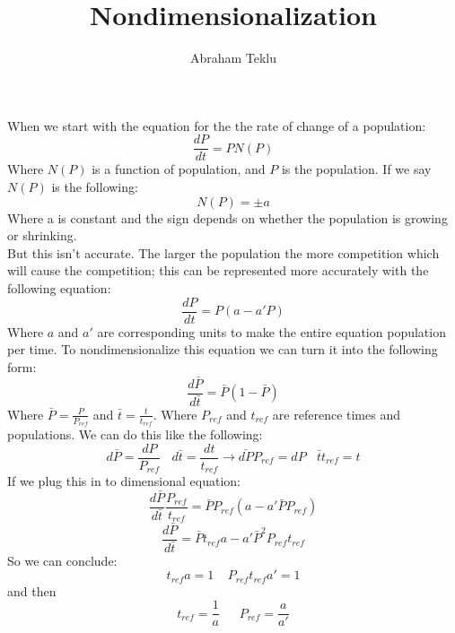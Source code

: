 \documentclass[12]{article}
\begin{document}
\title{Nondimensionalization}
\author{Abraham Teklu}
\date{}
\maketitle
When we start with the equation for the the rate of change of a population:
$$\frac{dP}{dt} = PN(P)$$
Where $N(P)$ is a function of population, and $P$ is the population. If we say $N(P)$ is the following:
$$N(P) = \pm a$$
Where a is constant and the sign depends on whether the population is growing or shrinking. 
\\
But this isn't accurate. The larger the population the more competition which will cause the competition; this can be represented more accurately with the following equation:
$$\frac{dP}{dt} = P(a-a'P)$$ 
Where $a$ and $a'$ are corresponding units to make the entire equation population per time. To nondimensionalize this equation we can turn it into the following form:
$$\frac{d\bar{P}}{d\bar{t}} = \bar{P}(1-\bar{P})$$ 
Where $\bar{P} = \frac{P}{P_{ref}}$ and $\bar{t} = \frac{t}{t_{ref}}$. Where $P_{ref}$ and $t_{ref}$ are reference times and populations. We can do this like the following:
$$d\bar{P} = \frac{dP}{P_{ref}}~~~~ d\bar{t} = \frac{dt}{t_{ref}} \rightarrow \bar{dP}P_{ref} = dP ~~~~ \bar{t}t_{ref} = t$$
If we plug this in to dimensional equation:
$$\frac{d\bar{P}}{d\bar{t}} \frac{P_{ref}}{t_{ref}} = \bar{P}P_{ref}(a-a'\bar{P}P_{ref})$$
$$\frac{d\bar{P}}{d\bar{t}} = \bar{P}t_{ref}a-a'\bar{P}^2P_{ref}t_{ref}$$
So we can conclude:
$$t_{ref}a = 1 ~~~~~ P_{ref}t_{ref}a' = 1$$
and then
$$t_{ref} = \frac{1}{a} ~~~~~~~ P_{ref} = \frac{a}{a'}$$
\end{document}
